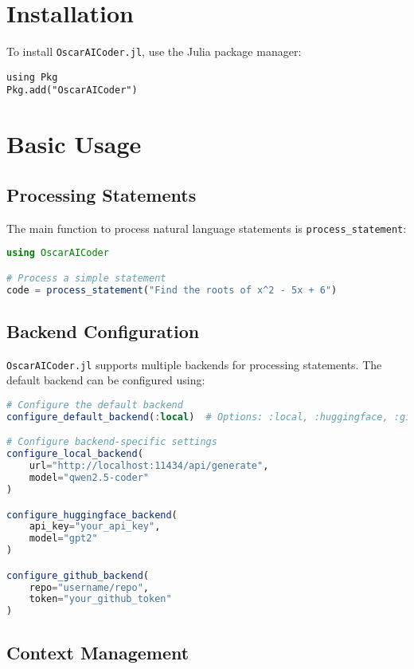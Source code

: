 \documentclass[11pt,a4paper]{article}
\newcommand{\func}[1]{\texttt{#1}}
\newcommand{\modname}[1]{\texttt{#1}}
\begin{document}
\section{Installation}
\label{sec:installation}

To install \modname{OscarAICoder.jl}, use the Julia package manager:

\begin{lstlisting}
using Pkg
Pkg.add("OscarAICoder")
\end{lstlisting}

\section{Basic Usage}
\label{sec:basic_usage}

\subsection{Processing Statements}

The main function to process natural language statements is \func{process\_statement}:

\begin{lstlisting}[language=Julia]
using OscarAICoder

# Process a simple statement
code = process_statement("Find the roots of x^2 - 5x + 6")
\end{lstlisting}

\subsection{Backend Configuration}

\modname{OscarAICoder.jl} supports multiple backends for processing statements. The default backend can be configured using:

\begin{lstlisting}[language=Julia]
# Configure the default backend
configure_default_backend(:local)  # Options: :local, :huggingface, :github

# Configure backend-specific settings
configure_local_backend(
    url="http://localhost:11434/api/generate",
    model="qwen2.5-coder"
)

configure_huggingface_backend(
    api_key="your_api_key",
    model="gpt2"
)

configure_github_backend(
    repo="username/repo",
    token="your_github_token"
)
\end{lstlisting}

\subsection{Context Management}
\end{document}
